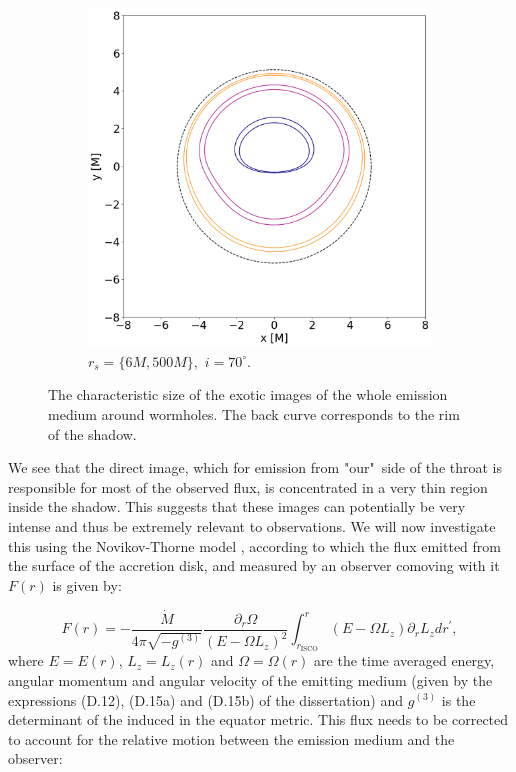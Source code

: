 \documentclass[12pt]{article}
\numberwithin{equation}{section}
\numberwithin{figure}{section}
\begin{document}
\begin{figure}[!htb]
\begin{subfigure}{6cm}
			\includegraphics[scale = 0.25]{Section_6_Morphology_of_the images_of_horizonless_spacetimes/WH_70_deg_r6_r500.png}
			\caption{$r_s = \{6M, 500M\},\,\, i = 70^\circ$.}
		\end{subfigure}
		\caption[The characteristic size of the exotic images of the whole emission medium around wormholes.]{\small The characteristic size of the exotic images of the whole emission medium around wormholes. The back curve corresponds to the rim of the shadow.} 
		\label{WH_img_size_deg}
	\end{figure}
	
	We see that the direct image, which for emission from "our"$\,$ side of the throat is responsible for most of the observed flux, is concentrated in a very thin region inside the shadow. This suggests that these images can potentially be very intense and thus be extremely relevant to observations. We will now investigate this using the Novikov-Thorne model \cite{Page1973}, according to which the flux emitted from the surface of the accretion disk, and measured by an observer comoving with it $F(r)$ is given by:
	
	\begin{equation}
		F(r) = - \frac{\dot{M}}{4\pi\sqrt{-g^{(3)}}}\frac{\partial_r\Omega}{\left(E - \Omega L_z\right)^2}\int_{r_\text{ISCO}}^r \left(E - \Omega L_z\right)\partial_rL_zdr^\prime,
	\end{equation}
	where $E = E(r)$, $L_z = L_z(r)$ and $\Omega = \Omega(r)$ are the time averaged energy, angular momentum and angular velocity of the emitting medium (given by the expressions (D.12), (D.15a) and (D.15b) of the dissertation) and $g^{(3)}$ is the determinant of the induced in the equator metric. This flux needs to be corrected to account for the relative motion between the emission medium and the observer:
	
\end{document}
